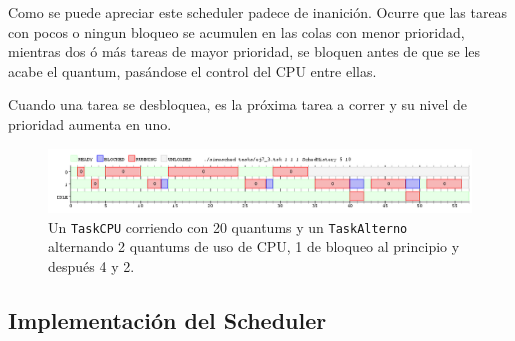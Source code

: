 	Como se puede apreciar este scheduler padece de inanición. Ocurre que las
	tareas con pocos o ningun bloqueo se acumulen en las colas con menor
	prioridad, mientras dos ó más tareas de mayor prioridad, se bloquen antes de
	que se les acabe el quantum, pasándose el control del CPU entre
	ellas.
	
	Cuando una tarea se desbloquea, es la próxima tarea a correr y su nivel de prioridad aumenta en uno.

	\begin{figure}[H]
		\begin{center}
			\includegraphics[width=1\columnwidth]{imagenes/ej7_3.png}
			\caption{Un \texttt{TaskCPU} corriendo con 20 quantums y un
			\texttt{TaskAlterno} alternando 2 quantums de uso de CPU, 1 de bloqueo al principio y después 4 y 2.}
		\end{center}
	\end{figure}

	\subsection{Implementación del Scheduler}

